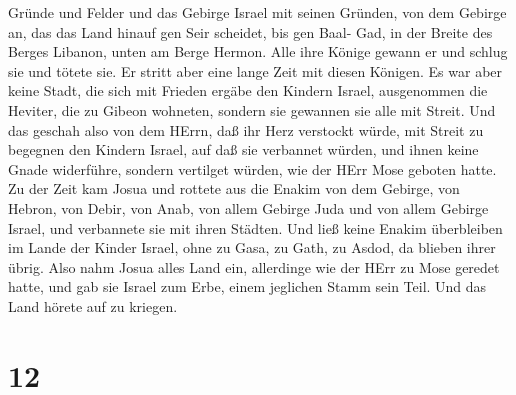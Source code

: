 Gründe und Felder und das Gebirge Israel mit seinen Gründen,
 von dem Gebirge an, das das Land hinauf gen Seir scheidet,
bis gen Baal- Gad, in der Breite des Berges Libanon, unten am Berge
Hermon. Alle ihre Könige gewann er und schlug sie und tötete sie.
 Er stritt aber eine lange Zeit mit diesen Königen.
 Es war aber keine Stadt, die sich mit Frieden ergäbe den
Kindern Israel, ausgenommen die Heviter, die zu Gibeon wohneten, sondern
sie gewannen sie alle mit Streit.  Und das geschah also von
dem HErrn, daß ihr Herz verstockt würde, mit Streit zu begegnen den
Kindern Israel, auf daß sie verbannet würden, und ihnen keine Gnade
widerführe, sondern vertilget würden, wie der HErr Mose geboten hatte.
 Zu der Zeit kam Josua und rottete aus die Enakim von dem
Gebirge, von Hebron, von Debir, von Anab, von allem Gebirge Juda und von
allem Gebirge Israel, und verbannete sie mit ihren Städten.
 Und ließ keine Enakim überbleiben im Lande der Kinder
Israel, ohne zu Gasa, zu Gath, zu Asdod, da blieben ihrer übrig.
 Also nahm Josua alles Land ein, allerdinge wie der HErr zu
Mose geredet hatte, und gab sie Israel zum Erbe, einem jeglichen Stamm
sein Teil. Und das Land hörete auf zu kriegen.

\hypertarget{section-11}{%
\section{12}\label{section-11}}

